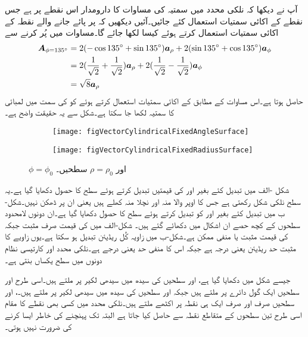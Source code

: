 آپ نے دیکھا کہ نلکی محدد میں سمتیہ کی مساوات کا دارومدار اس نقطے پر ہے جس نقطے کے اکائی سمتیات استعمال کئے جائیں۔آئیں دیکھیں کہ  پر پائے جانے والے  نقطہ  کے اکائی سمتیات استعمال کرتے ہوئے  کیسا لکھا جائے گا۔مساوات  میں  پُر کرنے سے
\begin{align*}
{\ensuremath{{\boldsymbol{A}}}}_{\phi=135^\circ}&=2(- \cos 135^\circ + \sin 135^\circ) {\boldsymbol{a}}_{\rho} +2( \sin 135^\circ + \cos 135^\circ){\boldsymbol{a}}_{\phi}\\
&=2(\frac{1}{\sqrt{2}}+\frac{1}{\sqrt{2}}){\boldsymbol{a}}_{\rho}+2(\frac{1}{\sqrt{2}}-\frac{1}{\sqrt{2}}){\boldsymbol{a}}_{\phi}\\
&=\sqrt{8}{\boldsymbol{a}}_{\rho}
\end{align*}
حاصل ہوتا ہے۔اس مساوات کے مطابق  کے اکائی سمتیات استعمال کرتے ہوئے  کو  کی سمت میں  لمبائی کا سمتیہ لکھا جا سکتا ہے۔شکل سے یہ حقیقت واضح ہے۔
%
\begin{figure}
\centering
\begin{subfigure}{0.5\textwidth}
\centering
\texttt{[image: figVectorCylindricalFixedAngleSurface]}
\end{subfigure}%
%
\begin{subfigure}{0.5\textwidth}
\centering
\texttt{[image: figVectorCylindricalFixedRadiusSurface]}
\end{subfigure}%
\caption{$\phi=\phi_0$ اور $\rho=\rho_0$ سطحیں۔}
\label{شکل_سمتیہ_نلکی_قطعی_زاویہ_سطح}
\end{figure}
شکل -الف میں  تبدیل کئے بغیر  اور  کی قیمتیں تبدیل کرتے ہوئے  سطح کا حصول دکھایا گیا ہے۔یہ سطح نلکی شکل رکھتی ہے  جس کا اوپر والا منہ اور نچلا منہ کھلے ہیں یعنی ان پر ڈھکن نہیں۔شکل-ب میں  تبدیل کئے بغیر  اور  کو تبدیل کرتے ہوئے  سطح کا حصول دکھایا گیا ہے۔ان دونوں لامحدود سطحوں کے کچھ حصے ان  اشکال میں  دکھائے گئے ہیں۔ شکل-الف میں  کی قیمت صرف مثبت جبکہ  کی قیمت مثبت یا منفی ممکن ہے۔شکل-ب میں زاویہ کُل  ریڈیئن تبدیل ہو سکتا ہے۔یوں زاویے کا مثبت حد  ریڈیئن یعنی  درجہ ہے جبکہ اس کا منفی حد  یعنی  درجے ہے۔نلکی محدد اور کارتیسی نظام دونوں میں   سطح یکساں بنتی ہے۔

جیسے شکل  میں دکھایا گیا ہے،  اور   سطحیں  کی سیدھ میں سیدھی لکیر پر ملتے ہیں۔اسی طرح  اور  سطحیں ایک گول دائرے پر ملتے ہیں جبکہ  اور  سطحیں  کی سیدھ میں سیدھی لکیر پر ملتے ہیں۔،  اور  سطحیں صرف اور صرف ایک ہی نقطہ  پر اکٹھے ملتے ہیں۔نلکی محدد میں کسی بھی نقطے  کا مقام اسی طرح تین سطحوں کے  متقاطع نقطہ سے حاصل کیا جاتا ہے البتہ  تک پہنچنے کی خاطر ایسا کرنے کی ضرورت نہیں ہوتی۔

